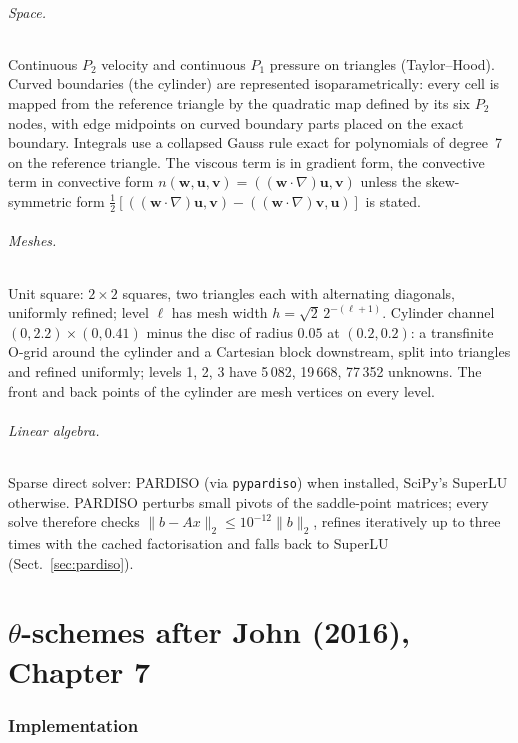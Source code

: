 \documentclass[11pt,a4paper]{article}
\newcommand{\bu}{\boldsymbol{u}}
\newcommand{\bv}{\boldsymbol{v}}
\newcommand{\bw}{\boldsymbol{w}}
\newcommand{\code}[1]{\texttt{#1}}
\begin{document}
\paragraph{Space.} Continuous $P_2$ velocity and continuous $P_1$ pressure on triangles (Taylor--Hood).
Curved boundaries (the cylinder) are represented isoparametrically: every cell is mapped from the reference
triangle by the quadratic map defined by its six $P_2$ nodes, with edge midpoints on curved boundary parts placed
on the exact boundary. Integrals use a collapsed Gauss rule exact for polynomials of degree~7 on the reference
triangle. The viscous term is in gradient form, the convective term in convective form
$n(\bw,\bu,\bv)=((\bw\cdot\nabla)\bu,\bv)$ unless the skew-symmetric form
$\frac12[((\bw\cdot\nabla)\bu,\bv)-((\bw\cdot\nabla)\bv,\bu)]$ is stated.

\paragraph{Meshes.} Unit square: $2\times2$ squares, two triangles each with alternating diagonals, uniformly
refined; level $\ell$ has mesh width $h=\sqrt2\,2^{-(\ell+1)}$. Cylinder channel $(0,2.2)\times(0,0.41)$ minus the
disc of radius $0.05$ at $(0.2,0.2)$: a transfinite O-grid around the cylinder and a Cartesian block downstream,
split into triangles and refined uniformly; levels 1, 2, 3 have 5\,082, 19\,668, 77\,352 unknowns. The front and back
points of the cylinder are mesh vertices on every level.

\paragraph{Linear algebra.} Sparse direct solver: PARDISO (via \code{pypardiso}) when installed, SciPy's SuperLU
otherwise. PARDISO perturbs small pivots of the saddle-point matrices; every solve therefore checks
$\|b-Ax\|_2\le10^{-12}\|b\|_2$, refines iteratively up to three times with the cached factorisation and falls back
to SuperLU (Sect.~\ref{sec:pardiso}).

\part{\texorpdfstring{$\theta$}{theta}-schemes after John (2016), Chapter 7}

\section{Implementation}
\end{document}
